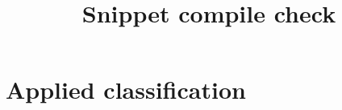 \documentclass{article}
\begin{document}
\title{Snippet compile check}
\maketitle
\section{Applied classification}\label{sec:applied}

\end{document}

